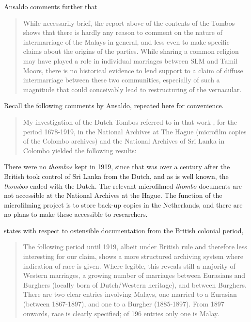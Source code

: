 Ansaldo comments further that

\begin{quote}
 While necessarily brief, the report above of the contents of the Tombos shows that there is hardly any reason to comment on the nature of intermarriage of the Malays in general, and less even to make specific claims about the origins of the parties.  While sharing a common religion may have played a role in individual marriages between SLM and Tamil Moors, there is no historical evidence to lend support to a claim of diffuse intermarriage between these two communities, especially of such a magnitude that could conceivably lead to restructuring of the vernacular.
\end{quote}

Recall the following comments by Ansaldo, repeated here for convenience.

\begin{quote}
  My investigation of the Dutch Tombos referred to in that work \citep{Hussainmiya1987}, for the period 1678-1919, in the National Archives at The Hague (microfilm copies of the Colombo archives) and the National Archives of Sri Lanka in Colombo yielded the following results:
\end{quote}

There were no \textit{thombos} kept in 1919, since that was over a century after the British took control of Sri Lanka from the Dutch, and as is well known, the \textit{thombos }ended with the Dutch. The relevant microfilmed \textit{thombo} documents are not accessible at the National Archives at the Hague. The function of the microfilming project is to store back-up copies in the Netherlands, and there are no plans to make these accessible to researchers.

\citet{Ansaldo2008genesis} states with respect to ostensible documentation from the British colonial period,

\begin{quote} 
 The following period until 1919, albeit under British rule and therefore less interesting for our claim, shows a more structured archiving system where indication of race is given.  Where legible, this reveals still a majority of Western marriages, a growing number of marriages between Eurasians and Burghers (locally born of Dutch/Western heritage), and between Burghers.  There are two clear entries involving Malays, one married to a Eurasian (between 1867-1897), and one to a Burgher (1885-1897).  From 1897 onwards, race is clearly specified; of 196 entries only one is Malay.

\end{quote}


